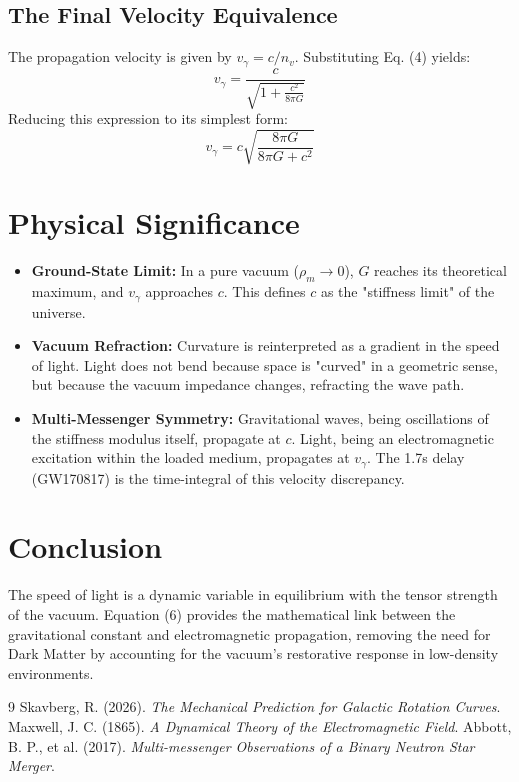 \documentclass[12pt,a4paper]{article}
\begin{document}
\subsection{The Final Velocity Equivalence}
The propagation velocity is given by $v_{\gamma} = c / n_v$. Substituting Eq. (4) yields:
\begin{equation}
v_{\gamma} = \frac{c}{\sqrt{1 + \frac{c^2}{8\pi G}}}
\end{equation}
Reducing this expression to its simplest form:
\begin{equation}
v_{\gamma} = c \sqrt{\frac{8\pi G}{8\pi G + c^2}}
\end{equation}



\section{Physical Significance}
\begin{itemize}
    \item \textbf{Ground-State Limit:} In a pure vacuum ($\rho_m \to 0$), $G$ reaches its theoretical maximum, and $v_{\gamma}$ approaches $c$. This defines $c$ as the "stiffness limit" of the universe.
    \item \textbf{Vacuum Refraction:} Curvature is reinterpreted as a gradient in the speed of light. Light does not bend because space is "curved" in a geometric sense, but because the vacuum impedance changes, refracting the wave path.
    \item \textbf{Multi-Messenger Symmetry:} Gravitational waves, being oscillations of the stiffness modulus itself, propagate at $c$. Light, being an electromagnetic excitation within the loaded medium, propagates at $v_{\gamma}$. The 1.7s delay (GW170817) is the time-integral of this velocity discrepancy.
\end{itemize}



\section{Conclusion}
The speed of light is a dynamic variable in equilibrium with the tensor strength of the vacuum. Equation (6) provides the mathematical link between the gravitational constant and electromagnetic propagation, removing the need for Dark Matter by accounting for the vacuum's restorative response in low-density environments.

\begin{thebibliography}{9}
 Skavberg, R. (2026). \textit{The Mechanical Prediction for Galactic Rotation Curves}. 
 Maxwell, J. C. (1865). \textit{A Dynamical Theory of the Electromagnetic Field}.
 Abbott, B. P., et al. (2017). \textit{Multi-messenger Observations of a Binary Neutron Star Merger}.
\end{thebibliography}
\end{document}
